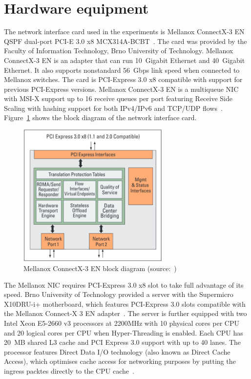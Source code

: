 
\section{Hardware equipment}\label{sec:analysis-hardware}
The network interface card used in the experiments is
Mellanox ConnectX-3 EN QSPF dual-port PCI-E 3.0 x8 MCX314A-BCBT~\cite{mellanox-product-brief}.
The card was provided by the Faculty of Information Technology, Brno University of Technology.
Mellanox ConnectX-3 EN is an adapter that can run 10~Gigabit Ethernet and 40~Gigabit Ethernet.
It also supports nonstandard 56~Gbps link speed when connected to Mellanox switches.
The card is PCI-Express 3.0 x8 compatible with support for previous PCI-Express versions.
Mellanox ConnectX-3 EN is a multiqueue NIC with MSI-X support up to 16 receive queues per port
featuring Receive Side Scaling with hashing support for both IPv4/IPv6 and TCP/UDP flows~\cite{mellanox-silicon, mellanox-user-manual}.
Figure~\ref{fig:setup-mlx-block-diagram} shows the block diagram of the network interface card.

\begin{figure}
	\centering
	\includegraphics[width=7.5cm,keepaspectratio]{fig/mlx-block-diagram.png}
	\caption{Mellanox ConnectX-3 EN block diagram (source:~\cite{mellanox-silicon})}
	\label{fig:setup-mlx-block-diagram}
	\bigskip
\end{figure}

The Mellanox NIC requires PCI-Express 3.0 x8 slot to take full advantage of its speed.
Brno University of Technology provided a server with
the Supermicro X10DRU-i+ motherboard, which
features PCI-Express 3.0 slots compatible with the Mellanox Connect-X 3 EN adapter~\cite{supermicro-board}.
The server is further equipped with two Intel Xeon E5-2660 v3 processors at 2200MHz with 10 physical cores per CPU
and 20 logical cores per CPU when Hyper-Threading is enabled.
Each CPU has 20~MB shared L3 cache and PCI Express 3.0 support with up to 40 lanes.
The processor features Direct Data I/O technology (also known as Direct Cache Access),
which optimises cache access for networking purposes by putting the ingress packtes directly to the CPU cache~\cite{intel-xeon-cpu}.


